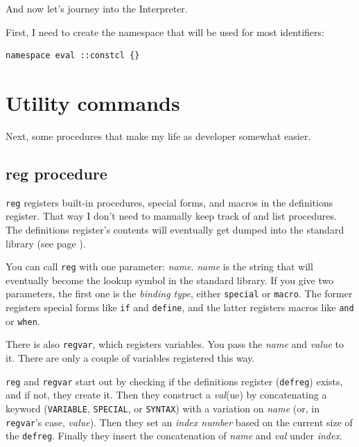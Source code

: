 \documentclass[twoside,9pt]{report}
\begin{document}
And now let's journey into the Interpreter.


First, I need to create the namespace that will be used for most identifiers:

\begin{lstlisting}
namespace eval ::constcl {}
\end{lstlisting}
\section{Utility commands}
\label{utility-commands}


Next, some procedures that make my life as developer somewhat easier.

\subsection{reg procedure}
\label{reg-procedure}


\texttt{reg} registers built-in procedures, special forms, and macros in the definitions register. That way I don't need to manually keep track of and list procedures. The definitions register's contents will eventually get dumped into the standard library (see page \pageref{environment-startup}).


You can call \texttt{reg} with one parameter: \emph{name}. \emph{name} is the string that will eventually become the lookup symbol in the standard library. If you give two parameters, the first one is the \emph{binding type}, either \texttt{special} or \texttt{macro}. The former registers special forms like \texttt{if} and \texttt{define}, and the latter registers macros like \texttt{and} or \texttt{when}.


There is also \texttt{regvar}, which registers variables. You pass the \emph{name} and \emph{value} to it. There are only a couple of variables registered this way.


\texttt{reg} and \texttt{regvar} start out by checking if the definitions register (\texttt{defreg}) exists, and if not, they create it. Then they construct a \emph{val}(ue) by concatenating a keyword (\texttt{VARIABLE}, \texttt{SPECIAL}, or \texttt{SYNTAX}) with a variation on \emph{name} (or, in \texttt{regvar}'s case, \emph{value}). Then they set an \emph{index number} based on the current size of the \texttt{defreg}. Finally they insert the concatenation of \emph{name} and \emph{val} under \emph{index}.
\end{document}
